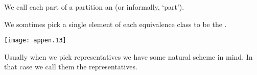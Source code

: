 We call each part of a partition an %
(or informally, `part').


We somtimes pick a single element of each equivalence class to be the 
.%
\begin{center}
  \texttt{[image: appen.13]}
%
%
%
%
\end{center}
Usually when we pick representatives we have some natural scheme in mind.
In that case we call them the
 representatives.%
%
%
 
